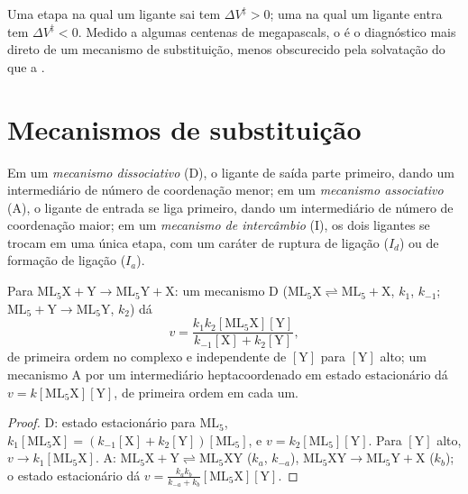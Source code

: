 Uma etapa na qual um ligante sai tem $\Delta V^{\ddagger} > 0$; uma na qual um ligante entra tem $\Delta V^{\ddagger}
< 0$. Medido a algumas centenas de megapascals, o  é o diagnóstico mais
direto de um mecanismo de substituição, menos obscurecido pela solvatação do que
a .

\section{Mecanismos de substituição}

\begin{definition}\label{def:b3:complex-mechanisms:mechanisms}
Em um \emph{mecanismo dissociativo} (D), o ligante
de saída parte primeiro, dando um intermediário de número de coordenação menor; em um
\emph{mecanismo associativo} (A), o ligante de entrada
se liga primeiro, dando um intermediário de número de coordenação maior; em um
\emph{mecanismo de intercâmbio} (I), os dois ligantes
se trocam em uma única etapa, com um caráter de ruptura de ligação ($I_d$) ou de formação de ligação ($I_a$).
\end{definition}

\begin{proposition}\label{prop:b3:complex-mechanisms:d-a-laws}
Para $\mathrm{ML_5X + Y \to ML_5Y + X}$: um mecanismo D ($\mathrm{ML_5X} \rightleftharpoons \mathrm{ML_5} + \mathrm X$, $k_1$, $k_{-1}$; $\mathrm{ML_5} + \mathrm Y
\to \mathrm{ML_5Y}$, $k_2$) dá
\[
  v = \frac{k_1k_2[\mathrm{ML_5X}][\mathrm Y]}{k_{-1}[\mathrm X] + k_2[\mathrm Y]},
\]
de primeira ordem no complexo e independente de $[\mathrm Y]$ para $[\mathrm Y]$ alto; um mecanismo A
por um intermediário heptacoordenado em estado estacionário dá $v =
k[\mathrm{ML_5X}][\mathrm Y]$, de primeira ordem em cada um.
\end{proposition}

\begin{proof}
D: estado estacionário para $\mathrm{ML_5}$, $k_1[\mathrm{ML_5X}] = (k_{-1}[\mathrm X] + k_2[\mathrm Y])[\mathrm{ML_5}]$, e $v = k_2[\mathrm{ML_5}][\mathrm Y]$.
Para $[\mathrm Y]$ alto, $v \to k_1[\mathrm{ML_5X}]$. A: $\mathrm{ML_5X} + \mathrm Y \rightleftharpoons \mathrm{ML_5XY}$ ($k_a$, $k_{-a}$), $\mathrm{ML_5XY} \to
\mathrm{ML_5Y} + \mathrm X$ ($k_b$); o estado estacionário dá $v = \frac{k_ak_b}{k_{-a} + k_b}[\mathrm{ML_5X}][\mathrm Y]$.
\end{proof}

